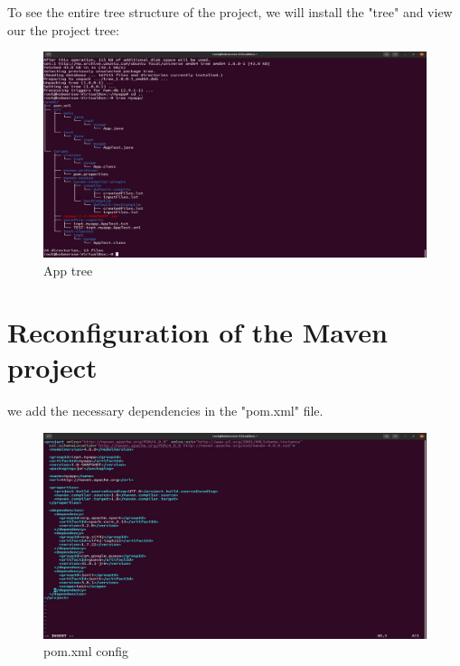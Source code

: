 \begin{spacing}{1.2}
\par To see the entire tree structure of the project, we will install the "tree" and view our the project tree:
\\
\begin{figure}[!htb] 
\begin{center} 
\includegraphics[width=1\linewidth]{Big_Data/Spark/Running a Spark Batch app in Java/App tree} 
\end{center} 
\caption{App tree} 
\end{figure} 
\FloatBarrier

\section{Reconfiguration of the Maven project}

\par we add the necessary dependencies in the "pom.xml" file.
\\
\begin{figure}[!htb] 
\begin{center} 
\includegraphics[width=1\linewidth]{Big_Data/Spark/Running a Spark Batch app in Java/pom.xml config} 
\end{center} 
\caption{pom.xml config} 
\end{figure} 
\FloatBarrier




\end{spacing}
